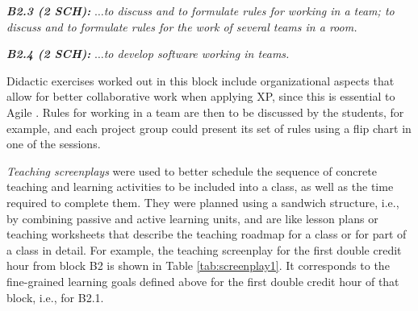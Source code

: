 \documentclass[conference]{IEEEtran}
\begin{document}
\textit{\bfseries B2.3 (2 SCH):} $\dots$\textit{to discuss and to formulate rules for working in a team; to discuss and to formulate rules for the work of several teams in a room.}

\textit{\bfseries B2.4 (2 SCH):} $\dots$\textit{to develop software working in teams.}

Didactic exercises worked out in this block include organizational aspects that allow for better collaborative work when applying XP, since this is essential to Agile \cite{Beetal01}. Rules for working in a team are then to be discussed by the students, for example, and each project group could present its set of rules using a flip chart in one of the sessions.

\textit{Teaching screenplays} were used to better schedule the sequence of concrete teaching and learning activities to be included into a class, as well as the time required to complete them. They were planned using a sandwich structure, i.e., by combining passive and active learning units, and are like lesson plans or teaching worksheets that describe the teaching roadmap for a class or for part of a class in detail. For example, the teaching screenplay for the first double credit hour from block B2 is shown in Table \ref{tab:screenplay1}. It corresponds to the fine-grained learning goals defined above for the first double credit hour of that block, i.e., for B2.1.
\end{document}
